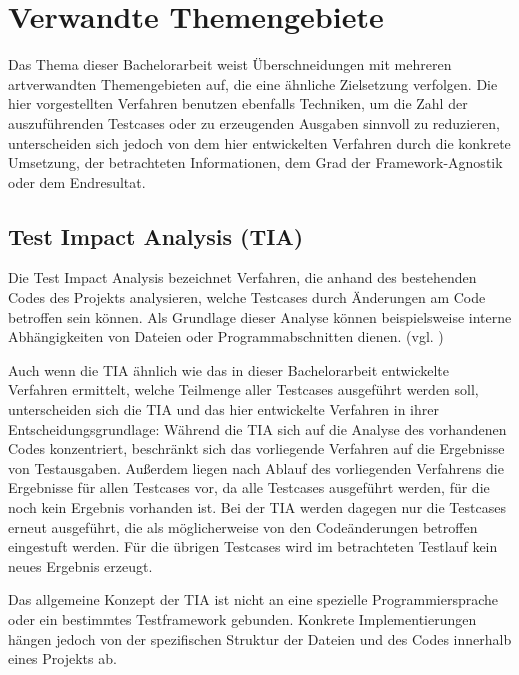 \chapter{Verwandte Themengebiete}\label{related}
Das Thema dieser Bachelorarbeit weist Überschneidungen mit mehreren artverwandten Themengebieten auf, die eine ähnliche Zielsetzung verfolgen. Die hier vorgestellten Verfahren benutzen ebenfalls Techniken, um die Zahl der auszuführenden Testcases oder zu erzeugenden Ausgaben sinnvoll zu reduzieren, unterscheiden sich jedoch von dem hier entwickelten Verfahren durch die konkrete Umsetzung, der betrachteten Informationen, dem Grad der Framework-Agnostik oder dem Endresultat. 

\section{Test Impact Analysis (TIA)}
Die Test Impact Analysis bezeichnet Verfahren, die anhand des bestehenden Codes des Projekts analysieren, welche Testcases durch Änderungen am Code betroffen sein können. Als Grundlage dieser Analyse können beispielsweise interne Abhängigkeiten von Dateien oder Programmabschnitten dienen. (vgl. \textcite[1-3]{pengTIA})

Auch wenn die TIA ähnlich wie das in dieser Bachelorarbeit entwickelte Verfahren ermittelt, welche Teilmenge aller Testcases ausgeführt werden soll, unterscheiden sich die TIA und das hier entwickelte Verfahren in ihrer Entscheidungsgrundlage: Während die TIA sich auf die Analyse des vorhandenen Codes konzentriert, beschränkt sich das vorliegende Verfahren auf die Ergebnisse von Testausgaben. Außerdem liegen nach Ablauf des vorliegenden Verfahrens die Ergebnisse für allen Testcases vor, da alle Testcases ausgeführt werden, für die noch kein Ergebnis vorhanden ist. Bei der TIA werden dagegen nur die Testcases erneut ausgeführt, die als möglicherweise von den Codeänderungen betroffen eingestuft werden. Für die übrigen Testcases wird im betrachteten Testlauf kein neues Ergebnis erzeugt.

Das allgemeine Konzept der TIA ist nicht an eine spezielle Programmiersprache oder ein bestimmtes Testframework gebunden. Konkrete Implementierungen hängen jedoch von der spezifischen Struktur der Dateien und des Codes innerhalb eines Projekts ab. 

